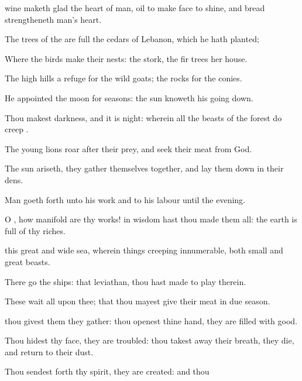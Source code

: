 {wine
{} maketh
glad the
heart of
man,
{}
oil to make
{}
face to
shine, and
bread
{}
strengtheneth
man’s
heart.
\par }{\Q {}The
trees of the
{} are
full
{} the
cedars of
Lebanon, which he hath
planted;
\par }{\Q {}Where the
birds make their
nests:
{} the
stork, the fir
trees
{} her
house.
\par }{\Q {}The
high
hills
{} a
refuge for the wild
goats;
{} the
rocks for the
conies.
\par }{\BB \par }{\Q {}He
appointed the
moon for
seasons: the
sun
knoweth his going
down.
\par }{\Q {}Thou
makest
darkness, and it is
night: wherein all the
beasts of the
forest do
creep
{}.
\par }{\Q {}The young
lions
roar after their
prey, and
seek their
meat from
God.
\par }{\Q {}The
sun
ariseth, they gather themselves
together, and lay them
down in their
dens.
\par }{\Q {}Man goeth
forth unto his
work and to his
labour until the
evening.
\par }{\Q {}O
{}, how
manifold are thy
works! in
wisdom hast thou
made them all: the
earth is
full of thy
riches.
\par }{\Q {} this
great and
wide
sea, wherein
{} things
creeping
innumerable, both
small and
great
beasts.
\par }{\Q {}There
go the
ships:
{} that
leviathan,
{} thou hast
made to
play therein.
\par }{\Q {}These
wait all upon thee; that thou mayest
give
{} their
meat in due
season.
\par }{\Q {} thou
givest them they
gather: thou
openest thine
hand, they are
filled with
good.
\par }{\Q {}Thou
hidest thy
face, they are
troubled: thou takest
away their
breath, they
die, and
return to their
dust.
\par }{\Q {}Thou
sendest forth thy
spirit, they are
created: and thou
}
